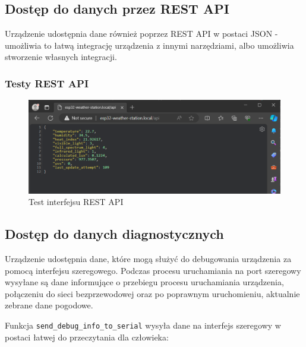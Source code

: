 \documentclass[12pt,a4paper]{article}
\begin{document}
\subsection{Dostęp do danych przez REST API}

Urządzenie udostępnia dane również poprzez REST API w postaci JSON - umożliwia to łatwą integrację urządzenia z innymi narzędziami, 
albo umożliwia stworzenie własnych integracji.

\subsubsection{Testy REST API}
\begin{figure}[H]
    \centering
    \includegraphics[width=\textwidth]{rest-api.png}
    \caption{Test interfejsu REST API}
\end{figure}

\subsection{Dostęp do danych diagnostycznych}

Urządzenie udostępnia dane, które mogą służyć do debugowania urządzenia za pomocą interfejsu szeregowego. Podczas procesu uruchamiania na port szeregowy wysyłane są dane informujące o przebiegu procesu uruchamiania urządzenia, połączeniu do sieci bezprzewodowej oraz po poprawnym uruchomieniu, aktualnie zebrane dane pogodowe.

Funkcja \texttt{send\_debug\_info\_to\_serial} wysyła dane na interfejs szeregowy w postaci łatwej do przeczytania dla człowieka:
\end{document}
